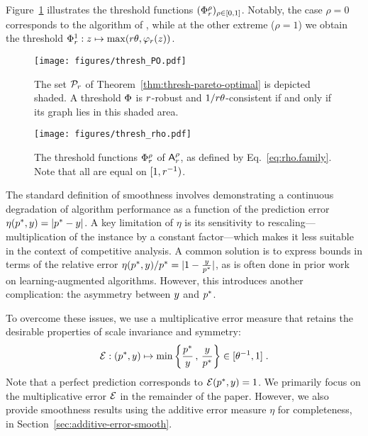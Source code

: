 Figure~\ref{fig:thresh_rho} illustrates the threshold functions  $(\Phi^\rho_r)_{\rho\in[0,1]}$. Notably, the case $\rho = 0$ corresponds to the algorithm of \citet{sun_pareto-optimal_2021}, while at the other extreme ($\rho = 1$) we obtain the threshold $\Phi^1_r: z \mapsto \max(r \theta, \varphi_r(z))$.

\begin{figure}
    \centering
    \begin{minipage}{0.49\textwidth}
        \centering
        \texttt{[image: figures/thresh\_PO.pdf]}
        \caption{
        The set $\mathcal{P}_r$ of Theorem~\ref{thm:thresh-pareto-optimal} is depicted shaded. A threshold $\Phi$ is $r$-robust and $1/r\theta$-consistent if and only if its graph lies in this shaded area.
        }
        \label{fig:thresh_PO}
    \end{minipage}
    \hfill
    \begin{minipage}{0.49\textwidth}
        \centering
        \texttt{[image: figures/thresh\_rho.pdf]}
        \caption{
        The threshold functions $\Phi^\rho_r$ of $\mbox{\textup{\textsf{A}}}_{r}^{\rho}$, as defined by Eq.~\eqref{eq:rho.family}. Note that all are equal on $[1,r^{-1})$.
        }
        \label{fig:thresh_rho}
        \end{minipage}
\end{figure}


The standard definition of smoothness involves demonstrating a continuous degradation of algorithm performance as a function of the prediction error $\eta(p^*, y) = |p^* - y|$. A key limitation of $\eta$ is its sensitivity to rescaling---multiplication of the instance
by a constant factor---which makes it less suitable in the context of competitive analysis.  
A common solution is to express bounds in terms of the relative error $\eta(p^*, y) / p^* = |1 - \frac{y}{p^*}|$, as is often done in prior work on learning-augmented algorithms. However, this introduces another complication: the asymmetry between $y$ and $p^*$.  

To overcome these issues, we use a multiplicative error measure that retains the desirable properties of scale invariance and symmetry:  
\begin{align}
    \mathcal{E}:(p^*,y)\mapsto \min\left\{\frac{p^*}{y}\,,\,\frac{y}{p^*}\right\}\in [\theta^{-1},1]\;.
\end{align}
Note that a perfect prediction corresponds to $\mathcal{E}(p^*, y) = 1$.
We primarily focus on the multiplicative error $\mathcal{E}$ in the remainder of the paper. However, we also provide smoothness results using the additive error measure $\eta$ for completeness, in Section~\ref{sec:additive-error-smooth}.


